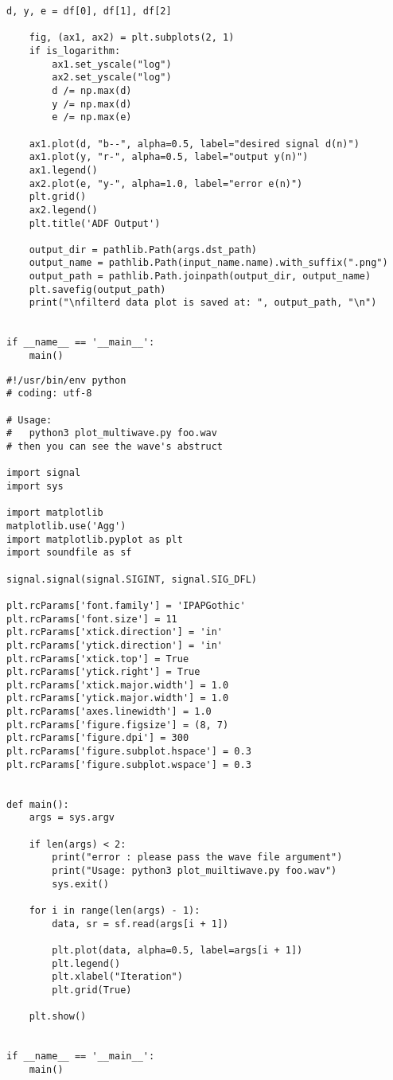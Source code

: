 \begin{lstlisting}[caption=plot\_from\_csv.py,label=plot\_from\_csv.py]
    d, y, e = df[0], df[1], df[2]

    fig, (ax1, ax2) = plt.subplots(2, 1)
    if is_logarithm:
        ax1.set_yscale("log")
        ax2.set_yscale("log")
        d /= np.max(d)
        y /= np.max(d)
        e /= np.max(e)

    ax1.plot(d, "b--", alpha=0.5, label="desired signal d(n)")
    ax1.plot(y, "r-", alpha=0.5, label="output y(n)")
    ax1.legend()
    ax2.plot(e, "y-", alpha=1.0, label="error e(n)")
    plt.grid()
    ax2.legend()
    plt.title('ADF Output')

    output_dir = pathlib.Path(args.dst_path)
    output_name = pathlib.Path(input_name.name).with_suffix(".png")
    output_path = pathlib.Path.joinpath(output_dir, output_name)
    plt.savefig(output_path)
    print("\nfilterd data plot is saved at: ", output_path, "\n")


if __name__ == '__main__':
    main()
\end{lstlisting}

\begin{lstlisting}[caption=plot\_multiwave.py,label=plot\_multiwave.py]
#!/usr/bin/env python
# coding: utf-8

# Usage:
#   python3 plot_multiwave.py foo.wav
# then you can see the wave's abstruct

import signal
import sys

import matplotlib
matplotlib.use('Agg')
import matplotlib.pyplot as plt
import soundfile as sf

signal.signal(signal.SIGINT, signal.SIG_DFL)

plt.rcParams['font.family'] = 'IPAPGothic'
plt.rcParams['font.size'] = 11
plt.rcParams['xtick.direction'] = 'in'
plt.rcParams['ytick.direction'] = 'in'
plt.rcParams['xtick.top'] = True
plt.rcParams['ytick.right'] = True
plt.rcParams['xtick.major.width'] = 1.0
plt.rcParams['ytick.major.width'] = 1.0
plt.rcParams['axes.linewidth'] = 1.0
plt.rcParams['figure.figsize'] = (8, 7)
plt.rcParams['figure.dpi'] = 300
plt.rcParams['figure.subplot.hspace'] = 0.3
plt.rcParams['figure.subplot.wspace'] = 0.3


def main():
    args = sys.argv

    if len(args) < 2:
        print("error : please pass the wave file argument")
        print("Usage: python3 plot_muiltiwave.py foo.wav")
        sys.exit()

    for i in range(len(args) - 1):
        data, sr = sf.read(args[i + 1])

        plt.plot(data, alpha=0.5, label=args[i + 1])
        plt.legend()
        plt.xlabel("Iteration")
        plt.grid(True)

    plt.show()


if __name__ == '__main__':
    main()
\end{lstlisting}

